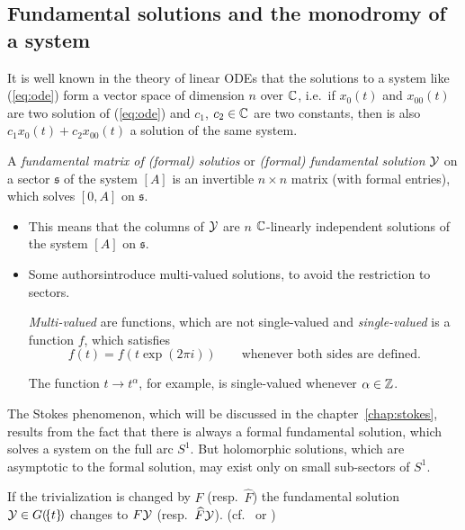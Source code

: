 \subsection{Fundamental solutions and the monodromy of a system}
It is well known in the theory of linear ODEs that the solutions to a system
like (\ref{eq:ode}) form a vector space of dimension $n$ over $\mathbb{C}$, i.e.\ if
$x_0(t)$ and $x_{00}(t)$ are two solution of (\ref{eq:ode}) and $c_1$,
$c_2\in\mathbb{C}$ are two constants, then is also $c_1x_0(t)+c_2x_{00}(t)$ a solution
of the same system.
\begin{defn}
  A \emph{fundamental matrix of (formal) solutios} or \emph{(formal)
  fundamental solution} $\mathcal{Y}$ on a sector $\mathfrak{s}$ of the
  system $[A]$ is an invertible $n\times n$ matrix (with formal entries), which
  solves $[0,A]$ on $\mathfrak{s}$.
  \begin{s-rem}
    \begin{itemize}
      \item This means that the columns of $\mathcal{Y}$ are $n$ $\mathbb{C}$-linearly
        independent solutions of the system $[A]$ on $\mathfrak{s}$.
      \item Some authors\PROBLEM[?] introduce multi-valued solutions, to avoid
        the restriction to sectors.

        \begin{einr}
          \emph{Multi-valued} are functions, which are not single-valued and
          \emph{single-valued} is a function $f$, which satisfies
          \[
            f(t)=f(t\exp(2\pi i)) \qquad\text{whenever both sides are defined.}
          \]
        \end{einr}
        The function $t\to t^\alpha$, for example, is single-valued whenever
        $\alpha\in\mathbb{Z}$.
    \end{itemize}
  \end{s-rem}
\end{defn}
The Stokes phenomenon, which will be discussed in the
chapter~\ref{chap:stokes}, results from the fact that there is always a formal
fundamental solution, which solves a system on the full arc $S^1$.
But holomorphic solutions, which are asymptotic to the formal solution, may
exist only on small sub-sectors of $S^1$.
\begin{rem}
  If the trivialization is changed by $F$ (resp.\ $\hat F$) the fundamental
  solution $\mathcal{Y}\in G(\!\{t\}\!)$ changes to $F\mathcal{Y}$ (resp.\ $\widehat F\mathcal{Y}$).
  (cf.\ \cite[Thm.4.3.1]{Loday2014} or \cite[2.1.3]{Zein2009})
\end{rem}

